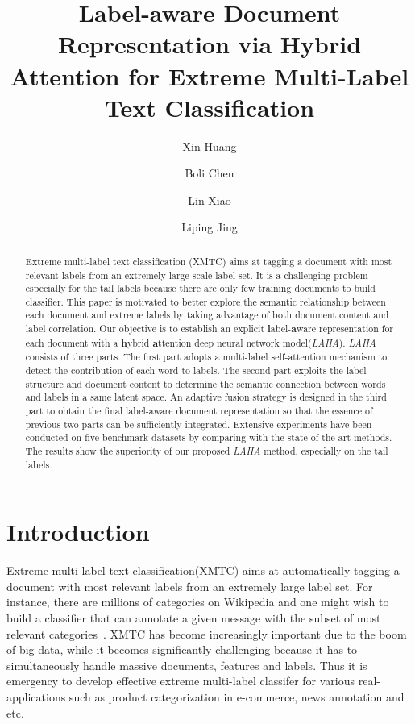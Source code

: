 \documentclass[runningheads]{llncs}
\begin{document}
\title{Label-aware Document Representation via Hybrid Attention for Extreme Multi-Label Text Classification}
\author{Xin Huang \and
Boli Chen \and
Lin Xiao \and
Liping Jing}

\maketitle              \begin{abstract}Extreme multi-label text classification (XMTC) aims at tagging a document with most relevant labels from an extremely large-scale label set. It is a challenging problem especially for the tail labels because there are only few training documents to build classifier. This paper is motivated to better explore the semantic relationship between each document and extreme labels by taking advantage of both document content and label correlation. Our objective is to establish an explicit \textbf{l}abel-\textbf{a}ware representation for each document with a \textbf{h}ybrid \textbf{a}ttention deep neural network model(\textit{LAHA}). \textit{LAHA} consists of three parts. The first part adopts a multi-label self-attention mechanism to detect the contribution of each word to labels. The second part exploits the label structure and document content to determine the semantic connection between words and labels in a same latent space. An adaptive fusion strategy is designed in the third part to obtain the final label-aware document representation so that the essence of previous two parts can be sufficiently integrated. Extensive experiments have been conducted on five benchmark datasets by comparing with the state-of-the-art methods. The results show the superiority of our proposed \textit{LAHA} method, especially on the tail labels.
	
\end{abstract}
\vspace{-2mm}
\section{Introduction}
Extreme multi-label text classification(XMTC) aims at automatically tagging a document with most relevant labels from an extremely large label set. For instance, there are millions of categories on Wikipedia and one might wish to build a classifier that can annotate a given message with the subset of most relevant categories~\cite{ref_article9}. XMTC has become increasingly important due to the boom of big data, while it becomes significantly challenging because it has to simultaneously handle massive documents, features and labels. Thus it is emergency to develop effective extreme multi-label classifer for various real-applications such as product categorization in e-commerce, news annotation and etc.
\end{document}
